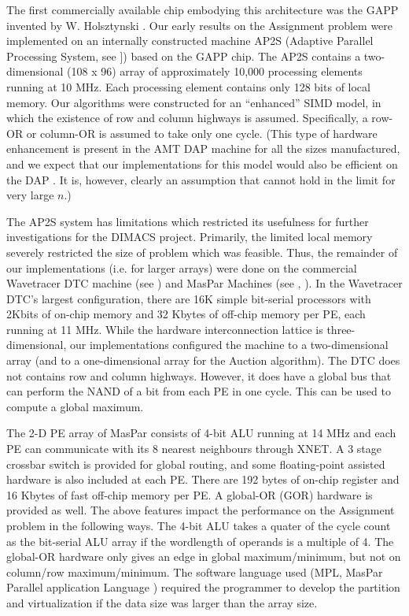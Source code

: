 The first commercially available chip embodying this architecture was 
the GAPP invented by W. Holsztynski \cite{ho86}.  Our early results 
on the Assignment problem were implemented on an internally 
constructed machine AP2S (Adaptive Parallel Processing System, 
see \cite{rjn90} ]) based on the GAPP chip.  The AP2S contains 
a two-dimensional (108 x 96) array of approximately 10,000 processing 
elements running at 10 MHz.  Each processing element contains only 128 
bits of local memory.  Our algorithms were constructed for an 
``enhanced'' SIMD model, in which the existence of row and 
column highways is assumed.  Specifically, a row-OR or 
column-OR is assumed to take only one cycle.  (This type of 
hardware enhancement is present in the AMT DAP machine for all the sizes 
manufactured, and we expect that our implementations for this 
model would also be efficient on the DAP \cite{re78}.  It 
is, however, clearly an assumption that cannot hold in the 
limit for very large $n$.)

The AP2S system has limitations which restricted its usefulness 
for further investigations for the DIMACS project.  Primarily, 
the limited local memory severely restricted the size of problem which 
was feasible.  
Thus, the remainder of our implementations (i.e. for larger arrays) 
were done on the commercial Wavetracer DTC machine (see \cite{ja90}) and
MasPar Machines (see \cite{bl90}, \cite{nic90}). 
In the Wavetracer DTC's largest configuration, there are 16K simple bit-serial 
processors with 2Kbits of on-chip memory and 32 Kbytes of off-chip
memory per PE, each running at 11 MHz.  
While the hardware 
interconnection lattice is three-dimensional, our implementations 
configured the machine to a two-dimensional array (and to a one-dimensional
array for the Auction algorithm).  The DTC does 
not contains row and column highways. However,
it does have a global bus that can perform the NAND of a bit from each
PE in one cycle. This can be used to compute a global maximum.

The 2-D PE array of MasPar consists of 4-bit ALU running at 14 MHz and 
each PE can communicate with its 8 nearest neighbours 
through XNET. A 3 stage crossbar switch is provided for global routing, and some
floating-point assisted hardware is also included at each PE.  
There are 192 bytes of on-chip register and 16 Kbytes of
fast off-chip memory per PE.  A global-OR (GOR) hardware is provided as 
well.  The above features impact the performance
on the Assignment problem in the following ways.  The 4-bit ALU takes a quater
of the cycle count as the bit-serial ALU array if the wordlength of operands is
a multiple of 4.  The global-OR hardware only gives an edge in global
maximum/minimum, but not on column/row maximum/minimum.  The software language
used (MPL, MasPar Parallel application Language \cite{ch90}) required the programmer to
develop the partition and virtualization if the data size was larger than
the array size.


